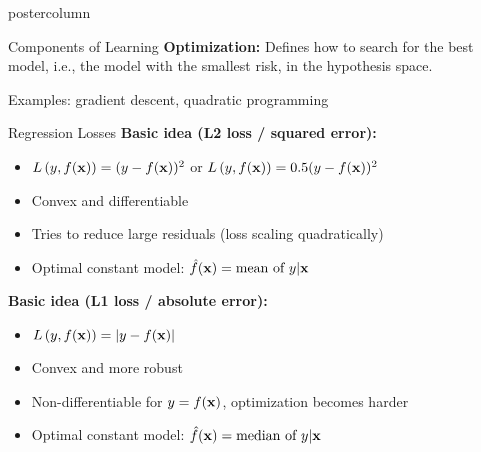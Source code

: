 \documentclass{beamer}
\begin{document}
\begin{frame}[fragile]{}
\begin{columns}
\begin{column}{.31\textwidth}
\begin{beamercolorbox}[center]{postercolumn}
\begin{minipage}{.98\textwidth}
{\begin{myblock}{Components of Learning}
          \textbf{Optimization: } Defines how to search for the best model, i.e., the model with the smallest {risk}, in the hypothesis space.
          
          \hspace*{1ex} Examples: gradient descent, quadratic programming
        
            
          \end{myblock}
          \begin{myblock}{Regression Losses}
			        \textbf{Basic idea (L2 loss / squared error):} 
						\begin{itemize}    
						  \setlength{\itemindent}{+.3in}
              \item $L\left(y, f(\mathbf{x})\right) = (y-f(\mathbf{x}))^2$ or $L\left(y, f(\mathbf{x})\right) = 0.5 (y-f(\mathbf{x}))^2$
              \item Convex and differentiable
              \item Tries to reduce large residuals (loss scaling quadratically)
              \item Optimal constant model: $\hat{f}(\mathbf{x}) = \text{mean of } y | \mathbf{x}$
            \end{itemize}

            \vspace*{1ex}

            
              \textbf{Basic idea (L1 loss / absolute error):} 
            \begin{itemize}     \setlength{\itemindent}{+.3in}
              \item $L\left(y, f(\mathbf{x})\right) = |y-f(\mathbf{x})|$
              \item Convex and more robust
              \item Non-differentiable for $y = f(\mathbf{x})$, optimization becomes harder
              \item Optimal constant model: $\hat{f}(\mathbf{x}) = \text{median of } y | \mathbf{x}$      
            \end{itemize}
          \end{myblock}

}
\end{minipage}
\end{beamercolorbox}
\end{column}
\end{columns}
\end{frame}
\end{document}
